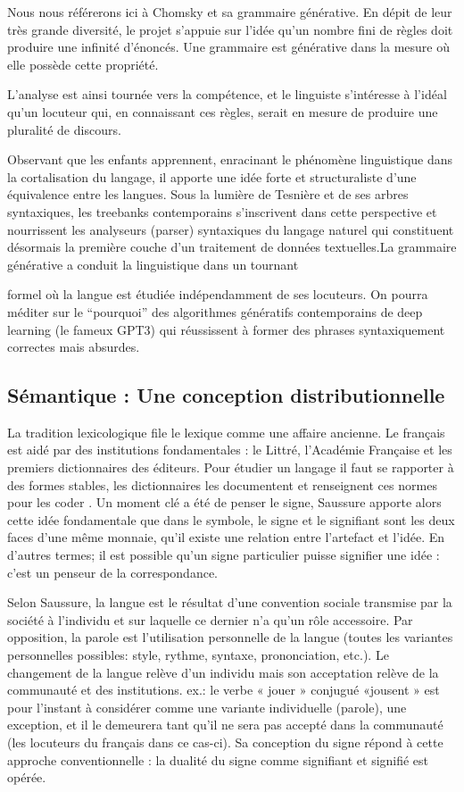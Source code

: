 \documentclass[
  letterpaper,
  DIV=11,
  numbers=noendperiod]{scrreprt}
\begin{document}
Nous nous référerons ici à Chomsky et sa grammaire générative. En dépit
de leur très grande diversité, le projet s'appuie sur l'idée qu'un
nombre fini de règles doit produire une infinité d'énoncés. Une
grammaire est générative dans la mesure où elle possède cette propriété.

L'analyse est ainsi tournée vers la compétence, et le linguiste
s'intéresse à l'idéal qu'un locuteur qui, en connaissant ces règles,
serait en mesure de produire une pluralité de discours.

Observant que les enfants apprennent, enracinant le phénomène
linguistique dans la cortalisation du langage, il apporte une idée forte
et structuraliste d'une équivalence entre les langues. Sous la lumière
de Tesnière et de ses arbres syntaxiques, les treebanks contemporains
s'inscrivent dans cette perspective et nourrissent les analyseurs
(parser) syntaxiques du langage naturel qui constituent désormais la
première couche d'un traitement de données textuelles.La grammaire
générative a conduit la linguistique dans un tournant

formel où la langue est étudiée indépendamment de ses locuteurs. On
pourra méditer sur le ``pourquoi'' des algorithmes génératifs
contemporains de deep learning (le fameux GPT3) qui réussissent à former
des phrases syntaxiquement correctes mais absurdes.

\subsection{Sémantique : Une conception
distributionnelle}\label{suxe9mantique-une-conception-distributionnelle}

La tradition lexicologique file le lexique comme une affaire ancienne.
Le français est aidé par des institutions fondamentales : le Littré,
l'Académie Française et les premiers dictionnaires des éditeurs. Pour
étudier un langage il faut se rapporter à des formes stables, les
dictionnaires les documentent et renseignent ces normes pour les coder .
Un moment clé a été de penser le signe, Saussure apporte alors cette
idée fondamentale que dans le symbole, le signe et le signifiant sont
les deux faces d'une même monnaie, qu'il existe une relation entre
l'artefact et l'idée. En d'autres termes; il est possible qu'un signe
particulier puisse signifier une idée : c'est un penseur de la
correspondance.

Selon Saussure, la langue est le résultat d'une convention sociale
transmise par la société à l'individu et sur laquelle ce dernier n'a
qu'un rôle accessoire. Par opposition, la parole est l'utilisation
personnelle de la langue (toutes les variantes personnelles possibles:
style, rythme, syntaxe, prononciation, etc.). Le changement de la langue
relève d'un individu mais son acceptation relève de la communauté et des
institutions. ex.: le verbe « jouer » conjugué «jousent » est pour
l'instant à considérer comme une variante individuelle (parole), une
exception, et il le demeurera tant qu'il ne sera pas accepté dans la
communauté (les locuteurs du français dans ce cas-ci). Sa conception du
signe répond à cette approche conventionnelle : la dualité du signe
comme signifiant et signifié est opérée.
\end{document}
